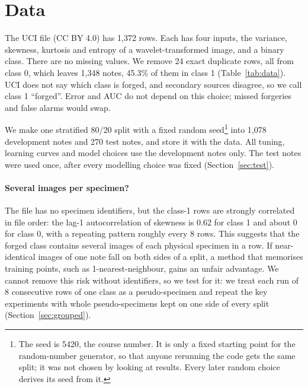 \section{Data}
\label{sec:data}
The UCI file \cite{lohweg2012uci} (CC BY 4.0) has 1,372 rows. Each has four inputs, the variance, skewness, kurtosis and entropy of a wavelet-transformed image, and a binary class. There are no missing values. We remove 24 exact duplicate rows, all from class 0, which leaves 1,348 notes, 45.3\% of them in class 1 (Table~\ref{tab:data}). UCI does not say which class is forged, and secondary sources disagree, so we call class 1 ``forged''. Error and AUC do not depend on this choice; missed forgeries and false alarms would swap.

\begin{table}[t]
  \centering
  \caption{Data size and shape at each stage. ``Forged'' is the share of class 1.}
  \label{tab:data}
  \small
  
\end{table}

We make one stratified 80/20 split with a fixed random seed\footnote{The seed is 5420, the course number. It is only a fixed starting point for the random-number generator, so that anyone rerunning the code gets the same split; it was not chosen by looking at results. Every later random choice derives its seed from it.} into 1,078 development notes and 270 test notes, and store it with the data. All tuning, learning curves and model choices use the development notes only. The test notes were used once, after every modelling choice was fixed (Section~\ref{sec:test}).

\paragraph{Several images per specimen?} The file has no specimen identifiers, but the class-1 rows are strongly correlated in file order: the lag-1 autocorrelation of skewness is 0.62 for class 1 and about 0 for class 0, with a repeating pattern roughly every 8 rows. This suggests that the forged class contains several images of each physical specimen in a row. If near-identical images of one note fall on both sides of a split, a method that memorises training points, such as 1-nearest-neighbour, gains an unfair advantage. We cannot remove this risk without identifiers, so we test for it: we treat each run of 8 consecutive rows of one class as a pseudo-specimen and repeat the key experiments with whole pseudo-specimens kept on one side of every split (Section~\ref{sec:grouped}).

